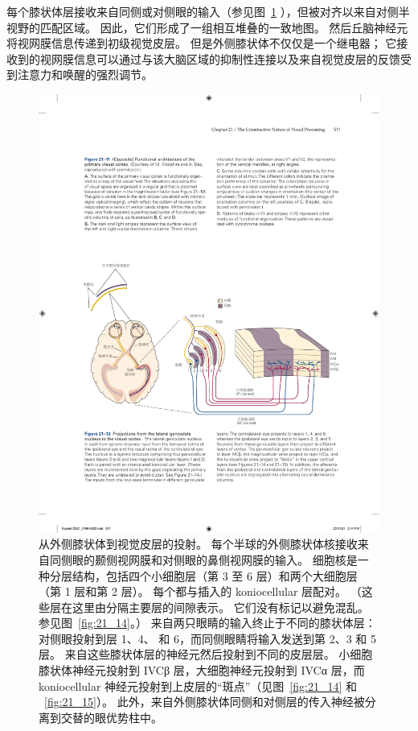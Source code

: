 每个膝状体层接收来自同侧或对侧眼的输入（参见图~\ref{fig:21_12} ），但被对齐以来自对侧半视野的匹配区域。
因此，它们形成了一组相互堆叠的一致地图。
然后丘脑神经元将视网膜信息传递到初级视觉皮层。
但是外侧膝状体不仅仅是一个继电器；
它接收到的视网膜信息可以通过与该大脑区域的抑制性连接以及来自视觉皮层的反馈受到注意力和唤醒的强烈调节。


\begin{figure}[htbp]
	\centering
	\includegraphics[width=1.0\linewidth]{chap21/fig_21_12}
	\caption{从外侧膝状体到视觉皮层的投射。
		每个半球的外侧膝状体核接收来自同侧眼的颞侧视网膜和对侧眼的鼻侧视网膜的输入。
		细胞核是一种分层结构，包括四个小细胞层（第 3 至 6 层）和两个大细胞层（第 1 层和第 2 层）。
		每个都与插入的 koniocellular 层配对。
		（这些层在这里由分隔主要层的间隙表示。
		它们没有标记以避免混乱。
		参见图~\ref{fig:21_14}。）
		来自两只眼睛的输入终止于不同的膝状体层：
		对侧眼投射到层 1、4、 和 6，而同侧眼睛将输入发送到第 2、3 和 5 层。
		来自这些膝状体层的神经元然后投射到不同的皮层层。
		小细胞膝状体神经元投射到 IVCβ 层，大细胞神经元投射到 IVCα 层，而 koniocellular 神经元投射到上皮层的“斑点”（见图~\ref{fig:21_14} 和 ~\ref{fig:21_15}）。
		此外，来自外侧膝状体同侧和对侧层的传入神经被分离到交替的眼优势柱中。}
	\label{fig:21_12}
\end{figure}



